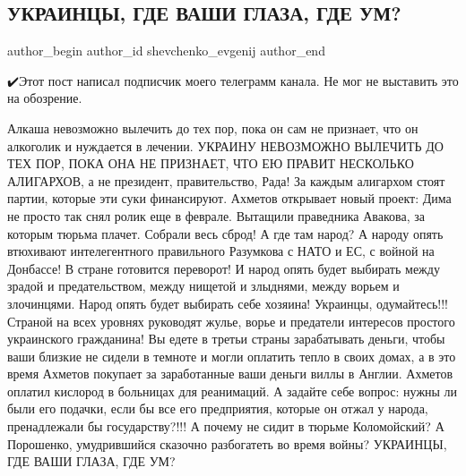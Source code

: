  
 
 
 
 
 
\subsection{УКРАИНЦЫ, ГДЕ ВАШИ ГЛАЗА, ГДЕ УМ?}
\label{sec:06_11_2021.fb.shevchenko_evgenij.1.ukraincy_glaza_um}
 
\ifcmt
 author_begin
   author_id shevchenko_evgenij
 author_end
\fi

✔️Этот пост написал подписчик моего телеграмм канала. Не мог не выставить это на
обозрение. 

Алкаша невозможно вылечить до тех пор, пока он сам не признает, что он
алкоголик и нуждается в лечении. УКРАИНУ НЕВОЗМОЖНО ВЫЛЕЧИТЬ ДО ТЕХ ПОР, ПОКА
ОНА НЕ ПРИЗНАЕТ, ЧТО ЕЮ ПРАВИТ НЕСКОЛЬКО АЛИГАРХОВ, а не президент,
правительство, Рада! За каждым алигархом стоят партии, которые эти суки
финансируют. Ахметов открывает новый проект: Дима не просто так снял ролик еще
в феврале. Вытащили праведника Авакова, за которым тюрьма плачет. Собрали весь
сброд! А где там народ? А народу опять втюхивают интелегентного правильного
Разумкова с НАТО и ЕС, с войной на Донбассе! В стране готовится переворот! И
народ опять будет выбирать между зрадой и предательством, между нищетой и
злыднями, между ворьем и злочинцями. Народ опять будет выбирать себе хозяина!
Украинцы, одумайтесь!!! Страной на всех уровнях руководят жулье, ворье и
предатели интересов простого украинского гражданина! Вы едете в третьи страны
зарабатывать деньги, чтобы ваши близкие не сидели в темноте и могли оплатить
тепло в своих домах, а в это время Ахметов покупает за заработанные ваши деньги
виллы в Англии. Ахметов оплатил кислород в больницах для реанимаций. А задайте
себе вопрос: нужны ли были его подачки, если бы все его предприятия, которые он
отжал у народа, пренадлежали бы государству?!!! А почему не сидит в тюрьме
Коломойский? А Порошенко, умудрившийся сказочно разбогатеть во время войны?
УКРАИНЦЫ, ГДЕ ВАШИ ГЛАЗА, ГДЕ УМ?

